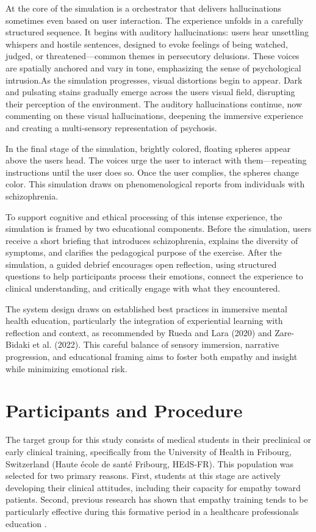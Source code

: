 At the core of the simulation is a orchestrator that delivers hallucinations sometimes even based on user interaction. The experience unfolds in a carefully structured sequence. It begins with auditory hallucinations: users hear unsettling whispers and hostile sentences, designed to evoke feelings of being watched, judged, or threatened—common themes in persecutory delusions. These voices are spatially anchored and vary in tone, emphasizing the sense of psychological intrusion.As the simulation progresses, visual distortions begin to appear. Dark and pulsating stains gradually emerge across the users visual field, disrupting their perception of the environment. The auditory hallucinations continue, now commenting on these visual hallucinations, deepening the immersive experience and creating a multi-sensory representation of psychosis.

In the final stage of the simulation, brightly colored, floating spheres appear above the users head. The voices urge the user to interact with them—repeating instructions until the user does so. Once the user complies, the spheres change color. This simulation draws on phenomenological reports from individuals with schizophrenia. \cite{Vanommen2019}

To support cognitive and ethical processing of this intense experience, the simulation is framed by two educational components. Before the simulation, users receive a short briefing that introduces schizophrenia, explains the diversity of symptoms, and clarifies the pedagogical purpose of the exercise. After the simulation, a guided debrief encourages open reflection, using structured questions to help participants process their emotions, connect the experience to clinical understanding, and critically engage with what they encountered.

The system design draws on established best practices in immersive mental health education, particularly the integration of experiential learning with reflection and context, as recommended by Rueda and Lara (2020) and Zare-Bidaki et al. (2022). This careful balance of sensory immersion, narrative progression, and educational framing aims to foster both empathy and insight while minimizing emotional risk.

\section{Participants and Procedure}
The target group for this study consists of medical students in their preclinical or early clinical training, specifically from the University of Health in Fribourg, Switzerland (Haute école de santé Fribourg, HEdS-FR). This population was selected for two primary reasons. First, students at this stage are actively developing their clinical attitudes, including their capacity for empathy toward patients. Second, previous research has shown that empathy training tends to be particularly effective during this formative period in a healthcare professionals education \cite{Hsia2022, Kuhail2022}.

